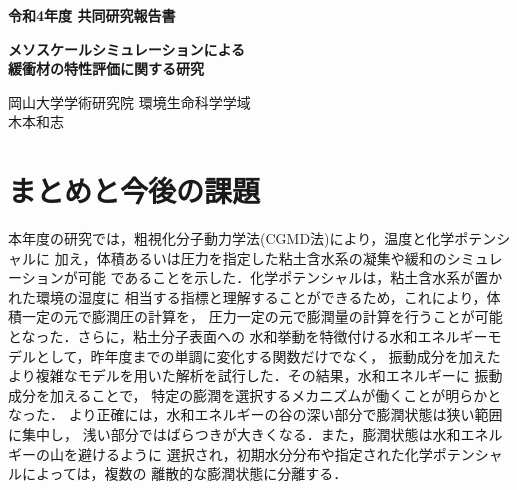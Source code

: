 ﻿\documentclass[11pt,a4j]{jarticle}
\newlength{\minitwocolumn}
\begin{document}
\newcommand{\fat}[1]{\mbox{\boldmath $#1$}}
\newcommand{\D}{\partial}
\newcommand{\w}{\omega}
\newcommand{\ga}{\alpha}
\newcommand{\gb}{\beta}
\newcommand{\gx}{\xi}
\newcommand{\gz}{\zeta}
\newcommand{\vhat}[1]{\hat{\fat{#1}}}
\newcommand{\spc}{\vspace{0.7\baselineskip}}
\newcommand{\halfspc}{\vspace{0.3\baselineskip}}

\newcommand{\twofig}[2]
 {
   \begin{figure}[h]
     \begin{minipage}[t]{\minitwocolumn}
         \begin{center}   #1
         \end{center}
     \end{minipage}
         \hspace{\columnsep}
     \begin{minipage}[t]{\minitwocolumn}
         \begin{center} #2
         \end{center}
     \end{minipage}
   \end{figure}
 }
\begin{center}
{\Large \bf 令和4年度 共同研究報告書}
\end{center}
\vspace{2mm}
\begin{center}
{\LARGE \bf 
メソスケールシミュレーションによる\\緩衝材の特性評価に関する研究} 
\end{center}
\begin{center}
岡山大学学術研究院 環境生命科学学域\\
木本和志
\end{center}
\vspace{10mm}
	
%
%
\section{まとめと今後の課題}
本年度の研究では，粗視化分子動力学法(CGMD法)により，温度と化学ポテンシャルに
加え，体積あるいは圧力を指定した粘土含水系の凝集や緩和のシミュレーションが可能
であることを示した．化学ポテンシャルは，粘土含水系が置かれた環境の湿度に
相当する指標と理解することができるため，これにより，体積一定の元で膨潤圧の計算を，
圧力一定の元で膨潤量の計算を行うことが可能となった．さらに，粘土分子表面への
水和挙動を特徴付ける水和エネルギーモデルとして，昨年度までの単調に変化する関数だけでなく，
振動成分を加えたより複雑なモデルを用いた解析を試行した．その結果，水和エネルギーに
振動成分を加えることで， 特定の膨潤を選択するメカニズムが働くことが明らかとなった．
より正確には，水和エネルギーの谷の深い部分で膨潤状態は狭い範囲に集中し，
浅い部分ではばらつきが大きくなる．また，膨潤状態は水和エネルギーの山を避けるように
選択され，初期水分分布や指定された化学ポテンシャルによっては，複数の
離散的な膨潤状態に分離する．
\end{document}

